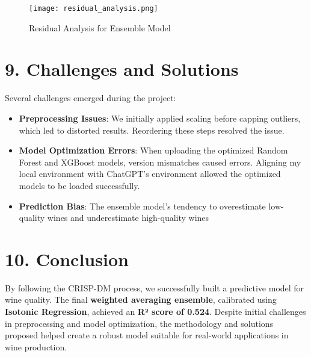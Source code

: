 \documentclass{article}
\begin{document}
\begin{figure}[h]
    \centering
    \texttt{[image: residual\_analysis.png]}
    \caption{Residual Analysis for Ensemble Model}
\end{figure}

\section{9. Challenges and Solutions}
Several challenges emerged during the project:
\begin{itemize}
    \item \textbf{Preprocessing Issues}: We initially applied scaling before capping outliers, which led to distorted results. Reordering these steps resolved the issue.
    \item \textbf{Model Optimization Errors}: When uploading the optimized Random Forest and XGBoost models, version mismatches caused errors. Aligning my local environment with ChatGPT’s environment allowed the optimized models to be loaded successfully.
    \item \textbf{Prediction Bias}: The ensemble model’s tendency to overestimate low-quality wines and underestimate high-quality wines
\end{itemize}

\section{10. Conclusion}
By following the CRISP-DM process, we successfully built a predictive model for wine quality. The final \textbf{weighted averaging ensemble}, calibrated using \textbf{Isotonic Regression}, achieved an \textbf{R² score of 0.524}. Despite initial challenges in preprocessing and model optimization, the methodology and solutions proposed helped create a robust model suitable for real-world applications in wine production.
\end{document}
